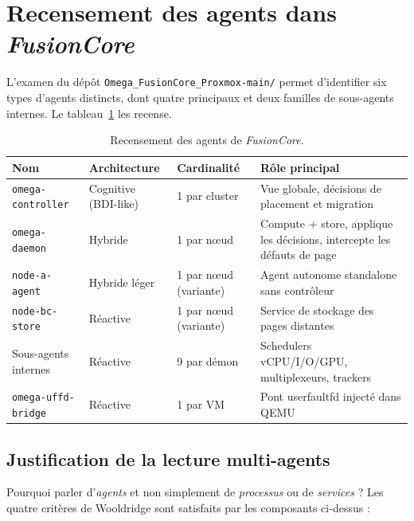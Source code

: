 \section{Recensement des agents dans \emph{FusionCore}}
\label{sec:sma-recensement}

L'examen du dépôt \texttt{Omega\_FusionCore\_Proxmox-main/} permet d'identifier six types d'agents distincts, dont quatre principaux et deux familles de sous-agents internes. Le tableau~\ref{tab:agents-recensement} les recense.

\begin{table}[H]
\centering
\small
\caption{Recensement des agents de \emph{FusionCore}.}
\begin{tabular}{p{2.6cm}p{2.2cm}p{3.0cm}p{5cm}}
\toprule
\textbf{Nom} & \textbf{Architecture} & \textbf{Cardinalité} & \textbf{Rôle principal} \\
\midrule
\texttt{omega-controller} & Cognitive (BDI-like) & 1 par cluster        & Vue globale, décisions de placement et migration \\
\texttt{omega-daemon}     & Hybride              & 1 par nœud           & Compute + store, applique les décisions, intercepte les défauts de page \\
\texttt{node-a-agent}     & Hybride léger        & 1 par nœud (variante) & Agent autonome standalone sans contrôleur \\
\texttt{node-bc-store}    & Réactive             & 1 par nœud (variante) & Service de stockage des pages distantes \\
Sous-agents internes      & Réactive             & 9 par démon          & Schedulers vCPU/I/O/GPU, multiplexeurs, trackers \\
\texttt{omega-uffd-bridge}& Réactive             & 1 par VM             & Pont userfaultfd injecté dans QEMU \\
\bottomrule
\end{tabular}
\label{tab:agents-recensement}
\end{table}

\subsection{Justification de la lecture multi-agents}

Pourquoi parler d'\emph{agents} et non simplement de \emph{processus} ou de \emph{services} ? Les quatre critères de Wooldridge sont satisfaits par les composants ci-dessus :

